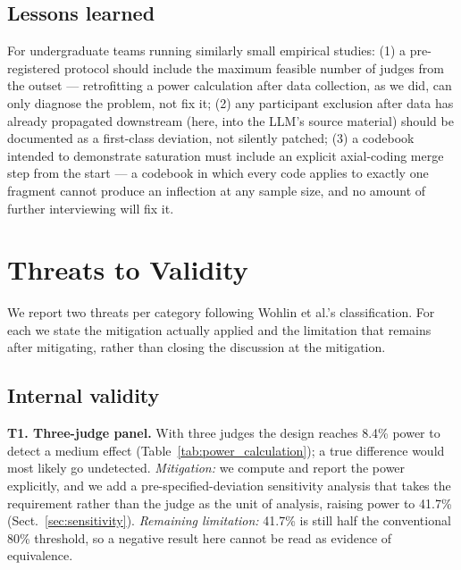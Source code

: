 \documentclass{llncs}
\begin{document}
\subsection{Lessons learned}
For undergraduate teams running similarly small empirical studies: (1) a
pre-registered protocol should include the maximum feasible number of judges from the
outset --- retrofitting a power calculation after data collection, as we did, can only
diagnose the problem, not fix it; (2) any participant exclusion after data has already
propagated downstream (here, into the LLM's source material) should be documented as a
first-class deviation, not silently patched; (3) a codebook intended to demonstrate
saturation must include an explicit axial-coding merge step from the start --- a codebook
in which every code applies to exactly one fragment cannot produce an inflection at any
sample size, and no amount of further interviewing will fix it.

\section{Threats to Validity}
\label{sec:threats}

We report two threats per category following Wohlin et al.'s classification. For
each we state the mitigation actually applied and the limitation that remains
after mitigating, rather than closing the discussion at the mitigation.

\subsection{Internal validity}

\textbf{T1. Three-judge panel.} With three judges the design reaches 8.4\% power
to detect a medium effect (Table~\ref{tab:power_calculation}); a true difference
would most likely go undetected. \emph{Mitigation:} we compute and report the
power explicitly, and we add a pre-specified-deviation sensitivity analysis that
takes the requirement rather than the judge as the unit of analysis, raising
power to 41.7\% (Sect.~\ref{sec:sensitivity}). \emph{Remaining limitation:}
41.7\% is still half the conventional 80\% threshold, so a negative result here
cannot be read as evidence of equivalence.
\end{document}
